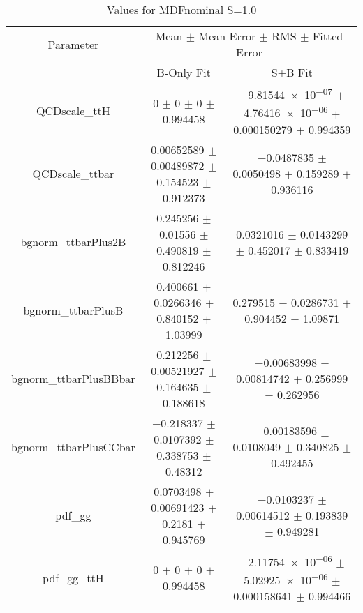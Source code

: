 \begin{table}
\centering
\caption{Values for MDFnominal S=1.0}
\begin{tabular}{ccc}
\toprule
Parameter & \multicolumn{2}{c}{Mean $\pm$ Mean Error $\pm$ RMS $\pm$ Fitted Error}\\
 & B-Only Fit & S+B Fit\\
\midrule
QCDscale\_ttH & \num{0} $\pm$ \num{0} $\pm$ \num{0} $\pm$ \num{0.994458} & \num{-9.81544e-07} $\pm$ \num{4.76416e-06} $\pm$ \num{0.000150279} $\pm$ \num{0.994359}\\
QCDscale\_ttbar & \num{0.00652589} $\pm$ \num{0.00489872} $\pm$ \num{0.154523} $\pm$ \num{0.912373} & \num{-0.0487835} $\pm$ \num{0.0050498} $\pm$ \num{0.159289} $\pm$ \num{0.936116}\\
bgnorm\_ttbarPlus2B & \num{0.245256} $\pm$ \num{0.01556} $\pm$ \num{0.490819} $\pm$ \num{0.812246} & \num{0.0321016} $\pm$ \num{0.0143299} $\pm$ \num{0.452017} $\pm$ \num{0.833419}\\
bgnorm\_ttbarPlusB & \num{0.400661} $\pm$ \num{0.0266346} $\pm$ \num{0.840152} $\pm$ \num{1.03999} & \num{0.279515} $\pm$ \num{0.0286731} $\pm$ \num{0.904452} $\pm$ \num{1.09871}\\
bgnorm\_ttbarPlusBBbar & \num{0.212256} $\pm$ \num{0.00521927} $\pm$ \num{0.164635} $\pm$ \num{0.188618} & \num{-0.00683998} $\pm$ \num{0.00814742} $\pm$ \num{0.256999} $\pm$ \num{0.262956}\\
bgnorm\_ttbarPlusCCbar & \num{-0.218337} $\pm$ \num{0.0107392} $\pm$ \num{0.338753} $\pm$ \num{0.48312} & \num{-0.00183596} $\pm$ \num{0.0108049} $\pm$ \num{0.340825} $\pm$ \num{0.492455}\\
pdf\_gg & \num{0.0703498} $\pm$ \num{0.00691423} $\pm$ \num{0.2181} $\pm$ \num{0.945769} & \num{-0.0103237} $\pm$ \num{0.00614512} $\pm$ \num{0.193839} $\pm$ \num{0.949281}\\
pdf\_gg\_ttH & \num{0} $\pm$ \num{0} $\pm$ \num{0} $\pm$ \num{0.994458} & \num{-2.11754e-06} $\pm$ \num{5.02925e-06} $\pm$ \num{0.000158641} $\pm$ \num{0.994466}\\
\bottomrule
\end{tabular}
\end{table}
